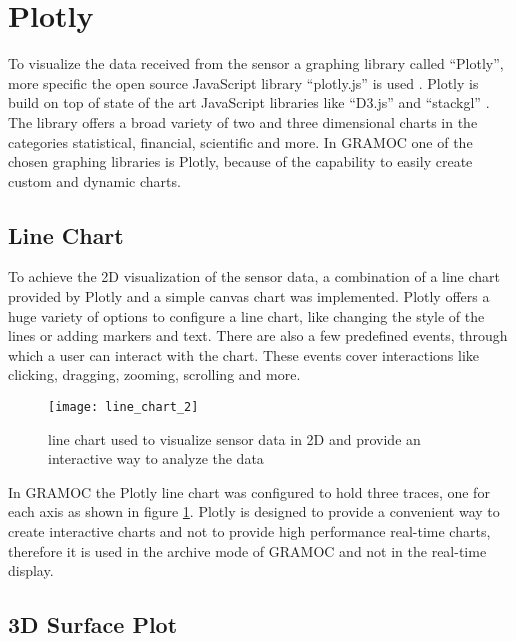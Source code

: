 \section{Plotly}
\label{sec:Plotly}
To visualize the data received from the sensor a graphing library called ``Plotly'', more specific the open source JavaScript library ``plotly.js'' is used \cite{Plotly} \cite{PlotlyJS}. Plotly is build on top of state of the art JavaScript libraries like ``D3.js''  and ``stackgl'' \cite{d3} \cite{stackgl}. The library offers a broad variety of two and three dimensional charts in the categories statistical, financial, scientific and more. In GRAMOC one of the chosen graphing libraries is Plotly, because of the capability to easily create custom and dynamic charts.

\subsection{Line Chart}
To achieve the 2D visualization of the sensor data, a combination of a line chart provided by Plotly and a simple canvas chart was implemented. Plotly offers a huge variety of options to configure a line chart, like changing the style of the lines or adding markers and text. There are also a few predefined events, through which a user can interact with the chart. These events cover interactions like clicking, dragging, zooming, scrolling and more.

\begin{figure}[H]
    \centering
    \texttt{[image: line\_chart\_2]}
    \caption{line chart used to visualize sensor data in 2D and provide an interactive way to analyze the data}
    \label{fig:plotlylinechart}
\end{figure}

In GRAMOC the Plotly line chart was configured to hold three traces, one for each axis as shown in figure \ref{fig:plotlylinechart}. Plotly is designed to provide a convenient way to create interactive charts and not to provide high performance real-time charts, therefore it is used in the archive mode of GRAMOC and not in the real-time display.

\subsection{3D Surface Plot}

